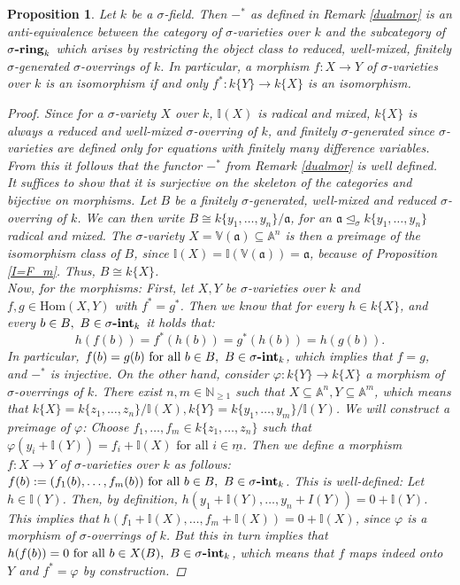 \documentclass{article}
\def\I{\mathbb{I}}
\def\NE{\mathbb{N}_{\geq1}}
\def\VV{\mathbb{V}}
\def\a{\mathfrak{a}}
\def\s{\sigma}
\def\si{\unlhd_{\sigma}}
\def\Hom{\text{Hom}}
\def\fa{\text{ for all }}
\newcommand{\catname}[1]{{\normalfont\textbf{#1}}}
\newcommand{\sintk}{\s\text{\catname{-int}}_k}
\newcommand{\sringk}{\s\text{\catname{-ring}}_k}
\newenvironment{bew}{\begin{proof}[Proof]}{\end{proof}}
\theoremstyle{plain}
\newtheorem{prop}[Satz]{Proposition}
\theoremstyle{definition}
\begin{document}
\begin{prop}\label{dualisequiv}
Let $k$ be a $\s$-field. Then $-^*$ as defined in Remark \ref{dualmor} is an anti-equivalence between the category of $\s$-varieties over $k$ and the subcategory of $\sringk$ which arises by restricting the object class to reduced, well-mixed, finitely $\s$-generated $\s$-overrings of $k$. 
In particular, a morphism $f: X \rightarrow Y$ of $\s$-varieties over $k$ is an isomorphism if and only $f^*: k\{Y\} \rightarrow k\{X\}$ is an isomorphism.
\begin{bew}
Since for a $\s$-variety $X$ over $k$, $\I(X)$ is radical and mixed, $k\{X\}$ is always a reduced and well-mixed $\s$-overring of $k$, 
and finitely $\s$-generated since $\s$-varieties are defined only for equations with finitely many difference variables. From this it follows that the functor $-^*$ from Remark \ref{dualmor} is well defined. \\
It suffices to show that it is surjective on the skeleton of the categories and bijective on morphisms. 
Let $B$ be a finitely $\s$-generated, well-mixed and reduced $\s$-overring of $k$. We can then write $B \cong k\{y_1,\ldots,y_n\}/\a$, for an $\a \si k\{y_1,\ldots,y_n\}$ radical and mixed. The $\s$-variety $X = \VV(\a) \subseteq \mathbb{A}^n$
is then a preimage of the isomorphism class of $B$, since $\I(X) = \I(\VV(\a)) = \a$, because of Proposition \ref{I=F_m}. Thus, $B \cong k\{X\}$. \\
\indent Now, for the morphisms: First, let $X,Y$ be $\s$-varieties over $k$ and $f,g \in \Hom(X,Y)$ with $f^* = g^*$. Then we know that for every $h \in k\{X\}$, and every $b \in B, ~ B \in \sintk$ it holds that:
\[ h(f(b)) = f^*(h(b)) = g^*(h(b)) = h(g(b)). \]
In particular, $f(b) = g(b) \fa b \in B, ~ B \in \sintk$, which implies that $f = g$, and $-^*$ is injective. 
On the other hand, consider $\varphi: k\{Y\} \rightarrow k\{X\}$ a morphism of $\s$-overrings of $k$. There exist $n,m \in \NE$ such that $X \subseteq \mathbb{A}^n, Y \subseteq \mathbb{A}^m$,
 which means that $k\{X\} = k\{z_1,\ldots,z_n\}/\I(X), k\{Y\} = k\{y_1,\ldots,y_m\}/\I(Y)$. We will construct a preimage of $\varphi$: Choose $f_1,\ldots,f_m \in k\{z_1,\ldots,z_n\}$ such that $\varphi(y_i + \I(Y)) = f_i + \I(X) \fa i \in \underline{m}$.
Then we define a morphism $f: X \rightarrow Y$ of $\s$-varieties over $k$ as follows: $f(b) := (f_1(b),\ldots,f_m(b)) \fa b \in B, ~ B \in \sintk$. This is well-defined: Let $h \in \I(Y)$. Then, by definition, $h(y_1 + \I(Y),\ldots,y_n + I(Y)) = 0 + \I(Y)$.
This implies that $h(f_1 + \I(X),\ldots,f_m + \I(X)) = 0 + \I(X)$, since $\varphi$ is a morphism of $\s$-overrings of $k$. But this in turn implies that $h(f(b)) = 0 \fa b \in X(B), ~ B \in \sintk$, which means that $f$ maps indeed onto $Y$ and $f^* = \varphi$ by construction.
\end{bew}
\end{prop}
\end{document}
